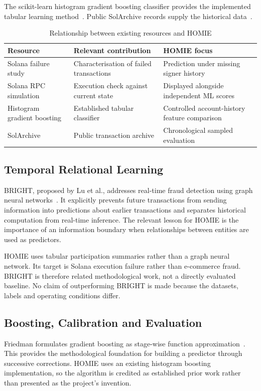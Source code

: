 \documentclass[12pt,a4paper,oneside]{report}
\begin{document}
The scikit-learn histogram gradient boosting classifier provides the implemented tabular learning method~\cite{hgb}. Public SolArchive records supply the historical data~\cite{archive}.
\begin{table}[H]\centering\caption{Relationship between existing resources and HOMIE}
\small\begin{tabularx}{\textwidth}{p{32mm}YY}\toprule
Resource&Relevant contribution&HOMIE focus\\\midrule
Solana failure study&Characterisation of failed transactions&Prediction under missing signer history\\
Solana RPC simulation&Execution check against current state&Displayed alongside independent ML scores\\
Histogram gradient boosting&Established tabular classifier&Controlled account-history feature comparison\\
SolArchive&Public transaction archive&Chronological sampled evaluation\\\bottomrule\end{tabularx}\end{table}
\subsection{Temporal Relational Learning}
BRIGHT, proposed by Lu et al., addresses real-time fraud detection using graph neural networks~\cite{bright}. It explicitly prevents future transactions from sending information into predictions about earlier transactions and separates historical computation from real-time inference. The relevant lesson for HOMIE is the importance of an information boundary when relationships between entities are used as predictors.

HOMIE uses tabular participation summaries rather than a graph neural network. Its target is Solana execution failure rather than e-commerce fraud. BRIGHT is therefore related methodological work, not a directly evaluated baseline. No claim of outperforming BRIGHT is made because the datasets, labels and operating conditions differ.

\subsection{Boosting, Calibration and Evaluation}
Friedman formulates gradient boosting as stage-wise function approximation~\cite{friedman}. This provides the methodological foundation for building a predictor through successive corrections. HOMIE uses an existing histogram boosting implementation, so the algorithm is credited as established prior work rather than presented as the project's invention.
\end{document}
